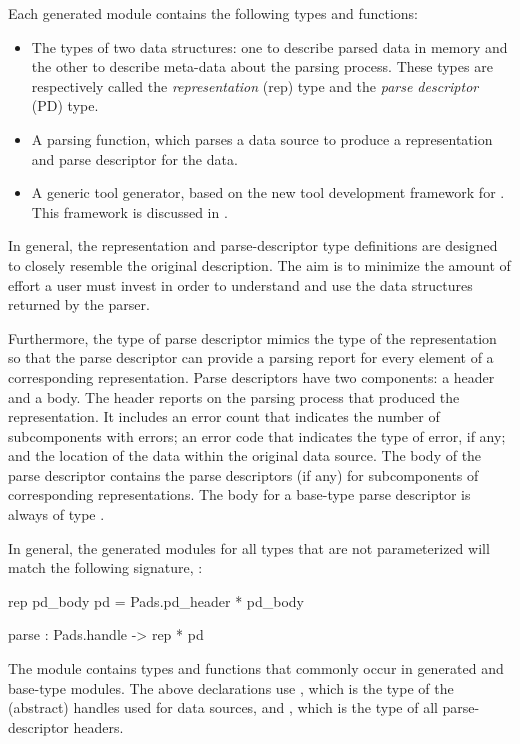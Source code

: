 Each generated module contains the following types and functions:
\begin{itemize}
\item The types of two data structures: one to describe parsed data in
  memory and the other to describe meta-data about the parsing process.
  These types are respectively called the
  \emph{representation} (rep) type and the \emph{parse descriptor} (PD)
  type.
\item A parsing function, which parses a data source to produce a
  representation and parse descriptor for the data.
\item A generic tool generator, based on the new tool development
  framework for \padsml{}. This framework is discussed in
  .
\end{itemize} 

In general, the representation and parse-descriptor type definitions
are designed to closely resemble the original description.
The aim is to minimize the amount of effort a user must invest in
order to understand and use the data structures returned by the
parser.

Furthermore, the type of parse descriptor mimics the type of the
representation so that the parse descriptor can provide a parsing
report for every element of a corresponding representation. Parse
descriptors have two components: a header and a body. The header
reports on the parsing process that produced the representation. It
includes an error count that indicates the number of subcomponents
with errors; an error code that indicates the type of error, if any;
and the location of the data within the original data source. The body
of the parse descriptor contains the parse descriptors (if any) for
subcomponents of corresponding representations. The body for a
base-type parse descriptor is always of type .

In general, the generated modules for all types that are not
parameterized will match the following signature, :
\begin{code}\scriptsize
{} rep
 pd\_body
 pd = Pads.pd_header * pd_body

 parse : Pads.handle -> rep * pd\end{code} The module
 contains types and functions that commonly occur in
generated and base-type modules. The above declarations use
, which is the type of the (abstract) handles used for
data sources, and , which is the type of all
parse-descriptor headers. 

